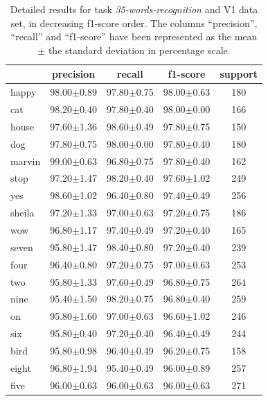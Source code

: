 \begin{table}[h!] \centering \scriptsize
	\caption{Detailed results for task \textit{35-words-recognition} and V1 data set, in decreasing f1-score order. The columns ``precision'', ``recall'' and ``f1-score'' have been represented as the mean $\pm$ the standard deviation in percentage scale. }
	\begin{tabular}{lcccc}
		\toprule
		{} &       precision &          recall &        f1-score & support \\
		\midrule
		happy     &  98.00$\pm$0.89 &  97.80$\pm$0.75 &  98.00$\pm$0.63 &     180 \\
		cat       &  98.20$\pm$0.40 &  97.80$\pm$0.40 &  98.00$\pm$0.00 &     166 \\
		house     &  97.60$\pm$1.36 &  98.60$\pm$0.49 &  97.80$\pm$0.75 &     150 \\
		dog       &  97.80$\pm$0.75 &  98.00$\pm$0.00 &  97.80$\pm$0.40 &     180 \\
		marvin    &  99.00$\pm$0.63 &  96.80$\pm$0.75 &  97.80$\pm$0.40 &     162 \\
		stop      &  97.20$\pm$1.47 &  98.20$\pm$0.40 &  97.60$\pm$1.02 &     249 \\
		yes       &  98.60$\pm$1.02 &  96.40$\pm$0.80 &  97.40$\pm$0.49 &     256 \\
		sheila    &  97.20$\pm$1.33 &  97.00$\pm$0.63 &  97.20$\pm$0.75 &     186 \\
		wow       &  96.80$\pm$1.17 &  97.40$\pm$0.49 &  97.20$\pm$0.40 &     165 \\
		seven     &  95.80$\pm$1.47 &  98.40$\pm$0.80 &  97.20$\pm$0.40 &     239 \\
		four      &  96.40$\pm$0.80 &  97.20$\pm$0.75 &  97.00$\pm$0.63 &     253 \\
		two       &  95.80$\pm$1.33 &  97.60$\pm$0.49 &  96.80$\pm$0.75 &     264 \\
		nine      &  95.40$\pm$1.50 &  98.20$\pm$0.75 &  96.80$\pm$0.40 &     259 \\
		on        &  95.80$\pm$1.60 &  97.00$\pm$0.63 &  96.60$\pm$1.02 &     246 \\
		six       &  95.80$\pm$0.40 &  97.20$\pm$0.40 &  96.40$\pm$0.49 &     244 \\
		bird      &  95.80$\pm$0.98 &  96.40$\pm$0.49 &  96.20$\pm$0.75 &     158 \\
		eight     &  96.80$\pm$1.94 &  95.40$\pm$0.49 &  96.00$\pm$0.89 &     257 \\
		five      &  96.00$\pm$0.63 &  96.00$\pm$0.63 &  96.00$\pm$0.63 &     271 \\

\end{tabular}
\end{table}
